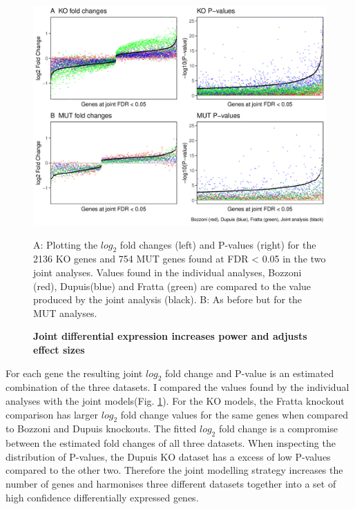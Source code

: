 \begin{figure}[ht!]
	\centering
	\includegraphics[width=\textwidth]{Figures/06_fus_meta/fitted_vs_individual_p_lfc.png}
	\caption{\textbf{Joint differential expression increases power and adjusts effect sizes}}
	A: Plotting the $log_2$ fold changes (left) and P-values (right) for the 2136 KO genes and 754 MUT genes found at FDR < 0.05 in the two joint analyses. Values found in the individual analyses, Bozzoni (red), Dupuis(blue) and Fratta (green) are compared to the value produced by the joint analysis (black).
	B: As before but for the MUT analyses.
	\label{fig:value_comparison}
\end{figure}

For each gene the resulting joint $log_2$ fold change and P-value is an estimated combination of the three datasets.
I compared the values found by the individual analyses with the joint models(Fig. \ref{fig:value_comparison}).
For the KO models, the Fratta knockout comparison has larger $log_2$ fold change values for the same genes when compared to Bozzoni and Dupuis knockouts. 
The fitted $log_2$ fold change is a compromise between the estimated fold changes of all three datasets. 
When inspecting the distribution of P-values, the Dupuis KO dataset has a excess of low P-values compared to the other two.
Therefore the joint modelling strategy increases the number of genes and harmonises three different datasets together into a set of high confidence differentially expressed genes.


